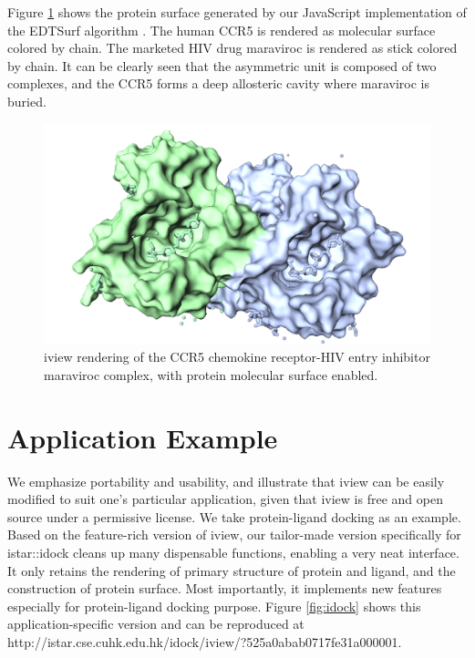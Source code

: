 Figure \ref{fig:surface} shows the protein surface generated by our JavaScript implementation of the EDTSurf algorithm \citep{1297,1350}. The human CCR5 is rendered as molecular surface colored by chain. The marketed HIV drug maraviroc is rendered as stick colored by chain. It can be clearly seen that the asymmetric unit is composed of two complexes, and the CCR5 forms a deep allosteric cavity where maraviroc is buried.

\begin{figure}
\begin{center}
\includegraphics[width=\linewidth]{../iview/surface.png}
\end{center}
\caption{iview rendering of the CCR5 chemokine receptor-HIV entry inhibitor maraviroc complex, with protein molecular surface enabled.}
\label{fig:surface}
\end{figure}

\section{Application Example}

We emphasize portability and usability, and illustrate that iview can be easily modified to suit one's particular application, given that iview is free and open source under a permissive license. We take protein-ligand docking as an example. Based on the feature-rich version of iview, our tailor-made version specifically for istar::idock cleans up many dispensable functions, enabling a very neat interface. It only retains the rendering of primary structure of protein and ligand, and the construction of protein surface. Most importantly, it implements new features especially for protein-ligand docking purpose. Figure \ref{fig:idock} shows this application-specific version and can be reproduced at http://istar.cse.cuhk.edu.hk/idock/iview/?525a0abab0717fe31a000001.

